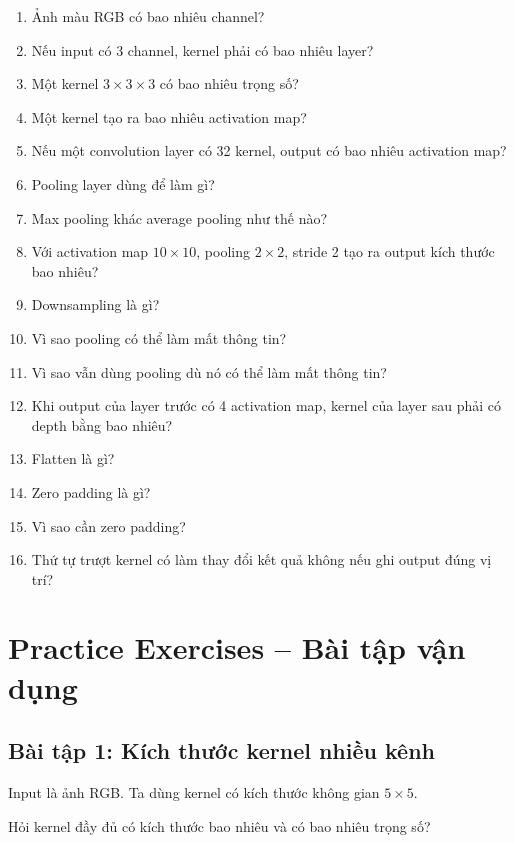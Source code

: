 \begin{enumerate}
    \item Ảnh màu RGB có bao nhiêu channel?
    \item Nếu input có 3 channel, kernel phải có bao nhiêu layer?
    \item Một kernel $3\times3\times3$ có bao nhiêu trọng số?
    \item Một kernel tạo ra bao nhiêu activation map?
    \item Nếu một convolution layer có 32 kernel, output có bao nhiêu activation map?
    \item Pooling layer dùng để làm gì?
    \item Max pooling khác average pooling như thế nào?
    \item Với activation map $10\times10$, pooling $2\times2$, stride 2 tạo ra output kích thước bao nhiêu?
    \item Downsampling là gì?
    \item Vì sao pooling có thể làm mất thông tin?
    \item Vì sao vẫn dùng pooling dù nó có thể làm mất thông tin?
    \item Khi output của layer trước có 4 activation map, kernel của layer sau phải có depth bằng bao nhiêu?
    \item Flatten là gì?
    \item Zero padding là gì?
    \item Vì sao cần zero padding?
    \item Thứ tự trượt kernel có làm thay đổi kết quả không nếu ghi output đúng vị trí?
\end{enumerate}

\section{Practice Exercises -- Bài tập vận dụng}

\subsection*{Bài tập 1: Kích thước kernel nhiều kênh}

Input là ảnh RGB. Ta dùng kernel có kích thước không gian $5\times5$.

Hỏi kernel đầy đủ có kích thước bao nhiêu và có bao nhiêu trọng số?

